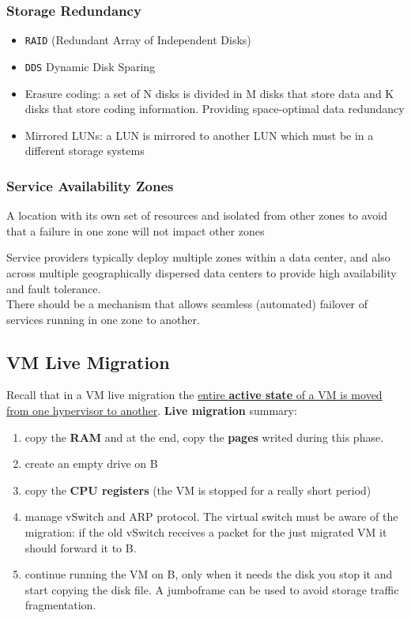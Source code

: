 \subsubsection{Storage Redundancy}

\begin{itemize}
   \item \texttt{RAID} (Redundant Array of Independent Disks)
   \item \texttt{DDS} Dynamic Disk Sparing
   \item Erasure coding: a set of N disks is divided in M disks that store data
   and K disks that store coding information. Providing space-optimal data redundancy
   \item Mirrored LUNs: a LUN is mirrored to another LUN which must be in a different storage systems
\end{itemize}


\subsubsection{Service Availability Zones}

\begin{definition}
   A location with its own set of resources and isolated from other zones to avoid that a failure in one zone will not impact other zones
\end{definition}

Service providers typically deploy multiple zones within a data center, and also across multiple geographically dispersed data centers to provide high availability and fault tolerance.\\
There should be a mechanism that allows seamless (automated) failover of services
running in one zone to another.

\subsection{VM Live Migration}
Recall that in a VM live migration the \ul{entire \textbf{active state} of a VM is moved
from one hypervisor to another}.
\textbf{Live migration} summary:\ns
\begin{enumerate}
\item
  copy the \textbf{RAM} and at the end, copy the \textbf{pages} writed
  during this phase.
\item
  create an empty drive on B
\item
  copy the \textbf{CPU registers} (the VM is stopped for a really short
  period)
\item
  manage vSwitch and ARP protocol. The virtual switch must be aware of
  the migration: if the old vSwitch receives a packet for the just
  migrated VM it should forward it to B.
\item
  continue running the VM on B, only when it needs the disk you stop it
  and start copying the disk file. A jumboframe can be used to avoid
  storage traffic fragmentation.
\end{enumerate}

